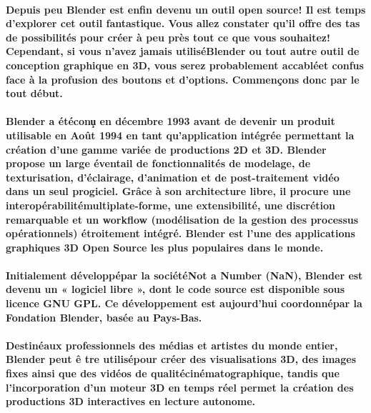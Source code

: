 
\newpage
\vspace{3cm}
 
\NewsItem{\textcolor[rgb]{0.55,0,0}{\huge Blender}}

\paragraph*{Depuis peu Blender est enfin devenu un outil open source! Il est temps d'explorer cet outil fantastique. Vous allez constater qu'il offre des tas de possibilit\'es pour cr\'eer \`a peu pr\`es tout ce que vous souhaitez! Cependant, si vous n'avez jamais utilis\'eBlender ou tout autre outil de conception graphique en 3D, vous serez probablement accabl\'eet confus face \`a la profusion des boutons et d'options. Commençons donc par le tout d\'ebut.}
\paragraph*{Blender a \'et\'econ\c u en d\'ecembre 1993 avant de devenir un produit utilisable en Ao\^ut 1994 en tant qu'application int\'egr\'ee permettant la cr\'eation d'une gamme vari\'ee de productions 2D et 3D. Blender propose un large \'eventail de fonctionnalit\'es de modelage, de texturisation, d'\'eclairage, d'animation et de post-traitement vid\'eo dans un seul progiciel. Gr\^ace \`a son architecture libre, il procure une interop\'erabilit\'emultiplate-forme, une extensibilit\'e, une discr\'etion remarquable et un workflow (mod\'elisation de la gestion des processus op\'erationnels) \'etroitement int\'egr\'e. Blender est l'une des applications graphiques 3D Open Source les plus populaires dans le monde.}
\paragraph*{Initialement d\'evelopp\'epar la soci\'et\'eNot a Number (NaN), Blender est devenu un « logiciel libre », dont le code source est disponible sous licence GNU GPL. Ce d\'eveloppement est aujourd'hui coordonn\'epar la Fondation Blender, bas\'ee au Pays-Bas.}
\paragraph*{Destin\'eaux professionnels des m\'edias et artistes du monde entier, Blender peut \^e tre utilis\'epour cr\'eer des visualisations 3D, des images fixes ainsi que des vid\'eos de qualit\'ecin\'ematographique, tandis que l'incorporation d'un moteur 3D en temps r\'eel permet la cr\'eation des productions 3D interactives en lecture autonome.}
